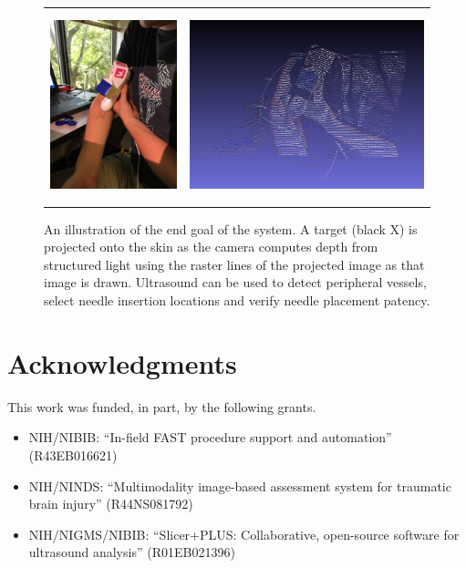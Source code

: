 \documentclass{llncs}
\begin{document}
\begin{figure}
\centering
\begin{tabular}{cc}
\centering
\includegraphics[height=5.5cm,keepaspectratio]{Hastings_arm} &
\includegraphics[height=5.5cm,keepaspectratio]{Hastings_arm_pointcloud}\\
\end{tabular}

\caption{An illustration of the end goal of the system. A target (black X) is projected onto the skin as the camera computes depth from structured light using the raster lines of the projected image as that image is drawn. Ultrasound can be used to detect peripheral vessels, select needle insertion locations and verify needle placement patency.
}

\end{figure}

\section*{Acknowledgments}
This work was funded, in part, by the following grants.

\begin{itemize}
	\item NIH/NIBIB: “In-field FAST procedure support and automation” (R43EB016621)
	\item NIH/NINDS: “Multimodality image-based assessment system for traumatic brain injury” (R44NS081792)
	\item NIH/NIGMS/NIBIB: “Slicer+PLUS: Collaborative, open-source software for ultrasound analysis” (R01EB021396)
\end{itemize}
\end{document}
